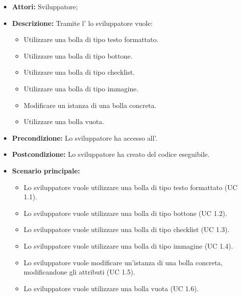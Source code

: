 \FloatBarrier
\begin{itemize}
\item \textbf{Attori:} Sviluppatore;
\item \textbf{Descrizione:} Tramite l' lo sviluppatore vuole:
	\begin{itemize}
	\item{Utilizzare una bolla di tipo testo formattato.} 
	\item{Utilizzare una bolla di tipo bottone.}
	\item{Utilizzare una bolla di tipo checklist.}
	\item{Utilizzare una bolla di tipo immagine.}
	\item{Modificare un istanza di una bolla concreta.}
	\item{Utilizzare una bolla vuota.}
	\end{itemize} 
\item \textbf{Precondizione:} Lo sviluppatore ha accesso all'.
\item \textbf{Postcondizione:} Lo sviluppatore ha creato del codice eseguibile. 
\item \textbf{Scenario principale:}
	\begin{itemize}
	\item{Lo sviluppatore vuole utilizzare una bolla di tipo testo formattato (UC 1.1).}
	\item{Lo sviluppatore vuole utilizzare una bolla di tipo bottone (UC 1.2).}
	\item{Lo sviluppatore vuole utilizzare una bolla di tipo checklist (UC 1.3).}
	\item{Lo sviluppatore vuole utilizzare una bolla di tipo immagine (UC 1.4).}
	\item{Lo sviluppatore vuole modificare un'istanza di una bolla concreta, modificandone gli attributi (UC 1.5).}
	\item {Lo sviluppatore vuole utilizzare una bolla vuota (UC 1.6).}
	\end{itemize}
\end{itemize}